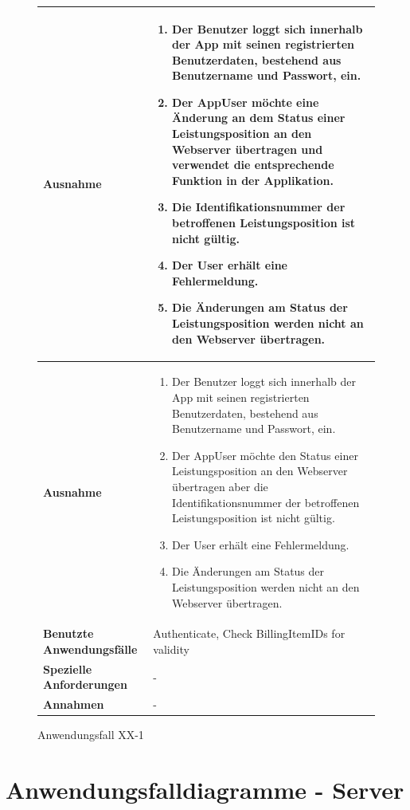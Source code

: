 			\begin{figure}[h]
	\centering
	\begin{tabularx}{\textwidth}{ X | X }
		\textbf{Ausnahme} &
				\begin{enumerate}
				\item Der Benutzer loggt sich innerhalb der App mit seinen registrierten Benutzerdaten, bestehend aus Benutzername und Passwort,  ein.  
					 \item Der AppUser m\"ochte eine \"Anderung an dem Status einer Leistungsposition an den Webserver \"ubertragen und verwendet die entsprechende Funktion in der Applikation. 
					 \item Die Identifikationsnummer der betroffenen Leistungsposition ist nicht g\"ultig.
					 \item Der User erh\"alt eine Fehlermeldung.
					 \item Die \"Anderungen am Status der Leistungsposition werden nicht an den Webserver \"ubertragen.
				\end{enumerate} \\ \hline
						\textbf{Ausnahme} &
				\begin{enumerate}
				\item Der Benutzer loggt sich innerhalb der App mit seinen registrierten Benutzerdaten, bestehend aus Benutzername und Passwort,  ein.  
					 \item Der AppUser m\"ochte den Status einer Leistungsposition an den Webserver \"ubertragen aber die Identifikationsnummer der betroffenen Leistungsposition ist nicht g\"ultig.
					 \item Der User erh\"alt eine Fehlermeldung.
					 \item Die \"Anderungen am Status der Leistungsposition werden nicht an den Webserver \"ubertragen.
				\end{enumerate}  \\ \hline
		\textbf{Benutzte Anwendungsfälle} & Authenticate,  Check BillingItemIDs for validity\\ \hline
		\textbf{Spezielle Anforderungen} & - \\ \hline
		\textbf{Annahmen} & -
	\end{tabularx}
	\caption{Anwendungsfall XX-1}
	\label{fig:anwendungsfall-app-tabelle-xx-4}
\end{figure}

\clearpage

\section{Anwendungsfalldiagramme - Server}

